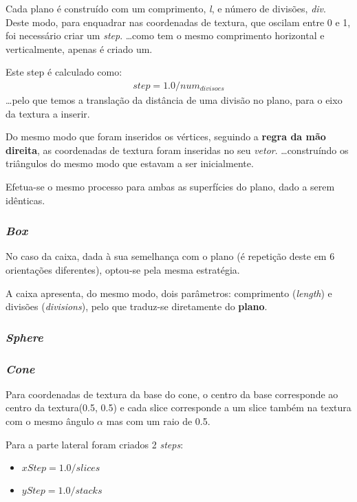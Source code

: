 \documentclass[relatorio.tex]{subfiles}
\begin{document}
Cada plano é construído com um comprimento, \textit{l}, 
e número de divisões, \textit{div}.
Deste modo, para enquadrar nas coordenadas de textura,
que oscilam entre 0 e 1, foi necessário criar 
um \textit{step}.
\dots como tem o mesmo comprimento horizontal e 
verticalmente, apenas é criado um.

Este step é calculado como:
\begin{eqnarray}
    step = 1.0 / num_{divisoes}
\end{eqnarray}
\dots pelo que temos a translação da distância de uma
divisão no plano, para o eixo da textura a inserir.

Do mesmo modo que foram inseridos os vértices,
seguindo a \textbf{regra da mão direita}, 
as coordenadas de textura foram inseridas no seu \textit{vetor}.
\dots construíndo os triângulos do mesmo 
modo que estavam a ser inicialmente.

Efetua-se o mesmo processo para ambas as 
superfícies do plano, dado a serem 
idênticas.

\subsubsection{\textit{Box}}

No caso da caixa, dada à sua semelhança com o plano 
(é repetição deste em 6 orientações diferentes),
optou-se pela mesma estratégia.

A caixa apresenta, do mesmo modo, dois parâmetros: comprimento (\textit{length})
e divisões (\textit{divisions}), pelo que traduz-se 
diretamente do \textbf{plano}.

\subsubsection{\textit{Sphere}}

\subsubsection{\textit{Cone}}
Para coordenadas de textura da base do cone, o centro da base
corresponde ao centro da textura(0.5, 0.5) e cada slice corresponde
a um slice também na textura com o mesmo ângulo $\alpha$ mas com um raio
de 0.5.

Para a parte lateral foram criados 2 \textit{steps}:
\begin{itemize}
    \item $xStep = 1.0 / slices$
    \item $yStep = 1.0 / stacks$
\end{itemize}
\end{document}
